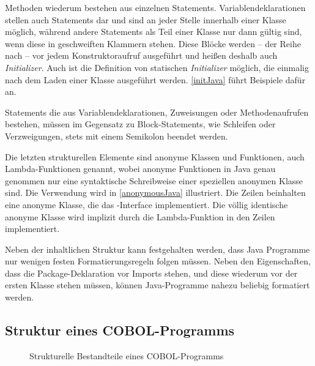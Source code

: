 Methoden wiederum bestehen aus einzelnen Statements. Variablendeklarationen stellen auch Statements dar und sind an jeder Stelle innerhalb einer Klasse möglich, während andere Statements als Teil einer Klasse nur dann gültig sind, wenn diese in geschweiften Klammern stehen. Diese Blöcke werden -- der Reihe nach -- vor jedem Konstruktoraufruf ausgeführt und heißen deshalb auch \textit{Initializer}. Auch ist die Definition von statischen \textit{Initializer} möglich, die einmalig nach dem Laden einer Klasse ausgeführt werden. \autoref{initJava} führt Beispiele dafür an.


Statements die aus Variablendeklarationen, Zuweisungen oder Methodenaufrufen bestehen, müssen im Gegensatz zu Block-Statements, wie \zB Schleifen oder Verzweigungen, stets mit einem Semikolon beendet werden. 

Die letzten strukturellen Elemente sind anonyme Klassen und Funktionen, auch Lambda-Funktionen genannt, wobei anonyme Funktionen in Java genau genommen nur eine syntaktische Schreibweise einer speziellen anonymen Klasse sind. Die Verwendung wird in \autoref{anonymousJava} illustriert. Die Zeilen  beinhalten eine anonyme Klasse, die das -Interface implementiert. Die völlig identische  anonyme Klasse wird implizit durch die Lambda-Funktion in den Zeilen  implementiert.


Neben der inhaltlichen Struktur kann festgehalten werden, dass Java Programme nur wenigen festen Formatierungsregeln folgen müssen. Neben den Eigenschaften, dass die Package-Deklaration vor Imports stehen, und diese wiederum vor der ersten Klasse stehen müssen, können Java-Programme nahezu beliebig formatiert werden.

\subsection*{Struktur eines COBOL-Programms}\label{cobolstructure}

\begin{figure}[H]
    \centering
    \resizebox{.9\linewidth}{!}{\unskip}
    \caption{Strukturelle Bestandteile eines COBOL-Programms \label{cobolStructureDiagram}}
\end{figure}

